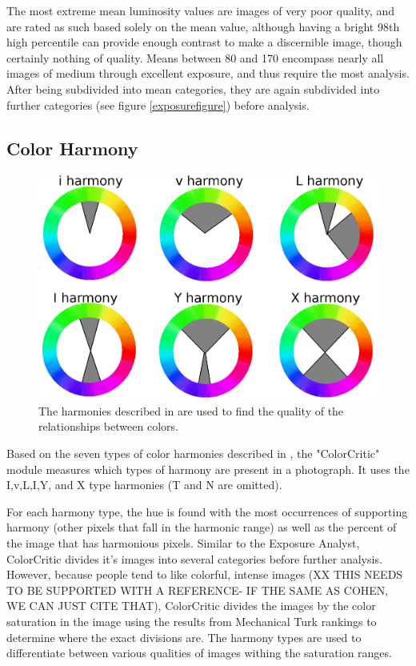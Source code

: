 \documentclass{article}
\begin{document}
The most extreme mean luminosity values are images of very poor quality, and are rated as such based solely on the mean value, although having a bright 98th high percentile can provide enough contrast to make a discernible image, though certainly nothing of quality. Means between 80 and 170 encompass nearly all images of medium through excellent exposure, and thus require the most analysis. After being subdivided into mean categories, they are again subdivided into further categories (see figure \ref{exposurefigure}) before analysis.

\subsection{Color Harmony}   
\begin{figure}[t]
  \centering
    \includegraphics[scale=0.38,clip]{colorharmony.eps}
  \caption{The harmonies described in \cite{COL:COL10004} are used to find the quality of the relationships between colors.}
\end{figure}

Based on the seven types of color harmonies described in \cite{Cohen-Or:2006:CH:1179352.1141933}, the "ColorCritic" module measures which types of harmony are present in a photograph. It uses the I,v,L,I,Y, and X type harmonies (T and N are omitted).

For each harmony type, the hue is found with the most occurrences of supporting harmony (other pixels that fall in the harmonic range) as well as the percent of the image that has harmonious pixels. Similar to the Exposure Analyst, ColorCritic divides it's images into several categories before further analysis. However, because people tend to like colorful, intense images (XX THIS NEEDS TO BE SUPPORTED WITH A REFERENCE- IF THE SAME AS COHEN, WE CAN JUST CITE THAT), ColorCritic divides the images by the color saturation in the image using the results from Mechanical Turk rankings to determine where the exact divisions are. The harmony types are used to differentiate between various qualities of images withing the saturation ranges.
\end{document}
